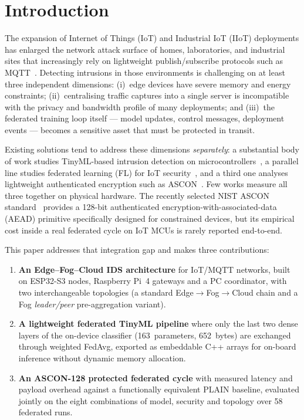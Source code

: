 \documentclass[runningheads]{llncs}
\begin{document}
\section{Introduction}
\label{sec:intro}

The expansion of Internet of Things (IoT) and Industrial IoT (IIoT)
deployments has enlarged the network attack surface of homes, laboratories,
and industrial sites that increasingly rely on lightweight publish/subscribe
protocols such as MQTT~\cite{ni2024iiot,amanullah2020deep}. Detecting
intrusions in those environments is challenging on at least three
independent dimensions: (i)~edge devices have severe memory and energy
constraints; (ii)~centralising traffic captures into a single server is
incompatible with the privacy and bandwidth profile of many deployments;
and (iii)~the federated training loop itself --- model updates, control
messages, deployment events --- becomes a sensitive asset that must be
protected in transit.

Existing solutions tend to address these dimensions \emph{separately}: a
substantial body of work studies TinyML-based intrusion detection on
microcontrollers~\cite{dini2024embedded,heydari2025tinyml}, a parallel line
studies federated learning (FL) for IoT
security~\cite{imteaj2022survey,ficco2024fl}, and a third one analyses
lightweight authenticated encryption such as
ASCON~\cite{nist2025ascon,kaur2025ascon}. Few works measure all three
together on physical hardware. The recently
selected NIST ASCON standard~\cite{nist2025ascon} provides a 128-bit
authenticated encryption-with-associated-data (AEAD) primitive specifically
designed for constrained devices, but its empirical cost inside a real
federated cycle on IoT MCUs is rarely reported end-to-end.

This paper addresses that integration gap and makes three contributions:

\begin{enumerate}
  \item \textbf{An Edge--Fog--Cloud IDS architecture} for IoT/MQTT
        networks, built on ESP32-S3 nodes, Raspberry Pi~4 gateways and a
        PC coordinator, with two interchangeable topologies (a standard
        Edge$\rightarrow$Fog$\rightarrow$Cloud chain and a Fog
        \emph{leader/peer} pre-aggregation variant).
  \item \textbf{A lightweight federated TinyML pipeline} where only the
        last two dense layers of the on-device classifier (163~parameters,
        652~bytes) are exchanged through weighted FedAvg, exported as
        embeddable C++ arrays for on-board inference without dynamic
        memory allocation.
  \item \textbf{An ASCON-128 protected federated cycle} with measured
        latency and payload overhead against a functionally equivalent
        PLAIN baseline, evaluated jointly on the eight combinations of
        model, security and topology over 58 federated runs.
\end{enumerate}
\end{document}
